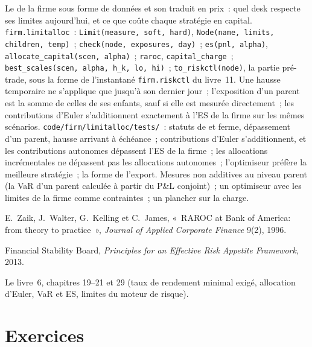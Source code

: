 \begin{build}
 Le  de la firme sous forme de données et son  traduit en prix~: quel desk respecte ses limites aujourd'hui, et ce que coûte chaque stratégie
en capital.
 \texttt{firm.limitalloc}~: \texttt{Limit(measure, soft, hard)}, \texttt{Node(name, limits, children, temp)}~;
\texttt{check(node, exposures, day)}~; \texttt{es(pnl, alpha)}, \texttt{allocate\_capital(scen, alpha)}~; \texttt{raroc}, \texttt{capital\_charge}~;
\texttt{best\_scales(scen, alpha, h\_k, lo, hi)}~; \texttt{to\_riskctl(node)}, la partie pré-trade, sous la forme de l'instantané
\texttt{firm.riskctl} du livre~11.
 Une hausse temporaire ne s'applique que jusqu'à son dernier jour~; l'exposition d'un parent est la somme de celles de ses enfants, sauf si elle est mesurée directement~;
les contributions d'Euler s'additionnent exactement à l'ES de la firme sur les mêmes scénarios.
 \texttt{code/firm/limitalloc/tests/}~: statuts de  et ferme, dépassement d'un parent, hausse arrivant à échéance~; contributions d'Euler
s'additionnent, et les contributions autonomes dépassent l'ES de la firme~; les allocations incrémentales ne dépassent pas les allocations autonomes~; l'optimiseur préfère la meilleure
stratégie~; la forme de l'export.
 Mesures non additives au niveau parent (la VaR d'un parent calculée à partir du P\&L conjoint)~; un optimiseur avec les limites de la firme comme contraintes~;
un plancher sur la charge.
\end{build}

\begin{omsources}
\item E.~Zaik, J.~Walter, G.~Kelling et C.~James, «~RAROC at Bank of America: from theory to practice~», \emph{Journal of Applied Corporate
Finance} 9(2), 1996.
\item Financial Stability Board, \emph{Principles for an Effective Risk Appetite Framework}, 2013.
\item Le livre~6, chapitres 19--21 et 29 (taux de rendement minimal exigé, allocation d'Euler, VaR et ES, limites du moteur de risque).
\end{omsources}

\section{Exercices}

